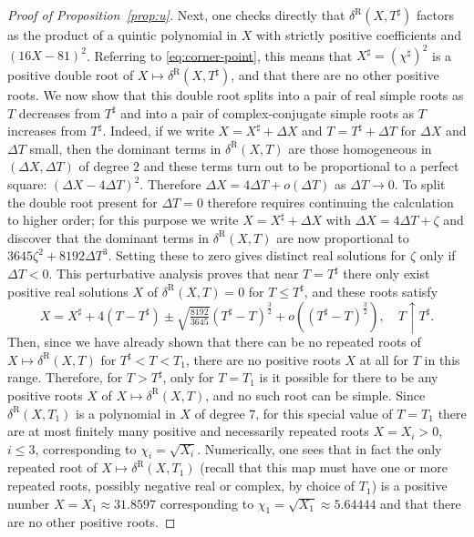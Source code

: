 \begin{proof}[Proof of Proposition~\ref{prop:u}]
Next, one checks directly that $\delta^\mathrm{R}(X,T^\sharp)$ factors as the product of a quintic polynomial in $X$ with strictly positive coefficients and $(16X-81)^2$.  Referring to \eqref{eq:corner-point}, this means that $X^\sharp=(\chi^\sharp)^2$ is a positive double root of $X\mapsto\delta^\mathrm{R}(X,T^\sharp)$, and that there are no other positive roots.  We now show that this double root splits into a pair of real simple roots as $T$ decreases from $T^\sharp$ and into a pair of complex-conjugate simple roots as $T$ increases from $T^\sharp$.  Indeed, if we write $X=X^\sharp+\Delta X$ and $T=T^\sharp+\Delta T$ for $\Delta X$ and $\Delta T$ small, then the dominant terms in $\delta^\mathrm{R}(X,T)$ are those homogeneous in $(\Delta X,\Delta T)$ of degree $2$ and these terms turn out to be proportional to a perfect square:  $(\Delta X-4\Delta T)^2$.  Therefore $\Delta X=4\Delta T+o(\Delta T)$ as $\Delta T\to 0$.  To split the double root present for $\Delta T=0$ therefore requires continuing the calculation to higher order; for this purpose we write $X=X^\sharp+\Delta X$ with $\Delta X=4\Delta T + \zeta$ and discover that the dominant terms in $\delta^\mathrm{R}(X,T)$ are now proportional to $3645\zeta^2+8192\Delta T^3$.  Setting these to zero gives distinct real solutions for $\zeta$ only if $\Delta T<0$.  This perturbative analysis proves that near $T=T^\sharp$ there only exist positive real solutions $X$ of $\delta^\mathrm{R}(X,T)=0$ for $T\le T^\sharp$, and these roots satisfy
\begin{equation}
X=X^\sharp+4(T-T^\sharp)\pm\sqrt{\tfrac{8192}{3645}}(T^\sharp-T)^\frac{3}{2} + o((T^\sharp-T)^\frac{3}{2}),\quad T\uparrow T^\sharp.
\label{eq:discriminant-roots-near-T0}
\end{equation}
Then, since we have already shown that there can be no repeated roots of $X\mapsto\delta^\mathrm{R}(X,T)$ for $T^\sharp<T<T_1$, there are no positive roots $X$ at all for $T$ in this range.  Therefore, for $T>T^\sharp$, only for $T=T_1$ is it possible for there to be any positive roots $X$ of $X\mapsto\delta^\mathrm{R}(X,T)$, and no such root can be simple.  Since $\delta^\mathrm{R}(X,T_1)$ is a polynomial in $X$ of degree $7$, for this special value of $T=T_1$ there are at most finitely many positive and necessarily repeated roots $X=X_i>0$, $i\le 3$, corresponding to $\chi_i=\sqrt{X_i}$.  Numerically, one sees that in fact the only repeated root of $X\mapsto\delta^\mathrm{R}(X,T_1)$ (recall that this map must have one or more repeated roots, possibly negative real or complex, by choice of $T_1$) is a positive number $X=X_1\approx31.8597$ corresponding to $\chi_1=\sqrt{X_1}\approx5.64444$ and that there are no other positive roots.


\end{proof}
